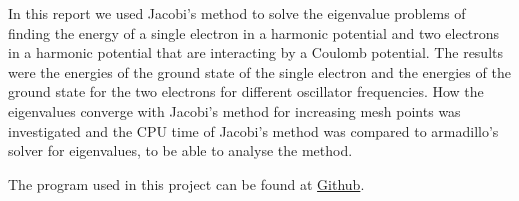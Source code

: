 In this report we used Jacobi's method to solve the eigenvalue problems of finding the energy of a single electron in a harmonic potential and two electrons in a harmonic potential that are interacting by a Coulomb potential. The results were the energies of the ground state of the single electron and the energies of the ground state for the two electrons for different oscillator frequencies. How the eigenvalues converge with Jacobi's method for increasing mesh points was investigated and the CPU time of Jacobi's method was compared to armadillo's solver for eigenvalues, to be able to analyse the method.


The program used in this project can be found at \href{https://github.com/kjetka/Project2}{Github}. 